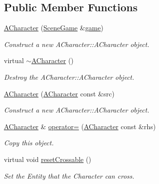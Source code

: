 \subsection*{Public Member Functions}
\begin{DoxyCompactItemize}
\item 
\hyperlink{class_a_character_a110d0c6cd4cb1803d749e8638218790a}{A\+Character} (\hyperlink{class_scene_game}{Scene\+Game} \&\hyperlink{class_a_entity_aa2c05db944a8b7487eb8470dd20211ab}{game})
\begin{DoxyCompactList}\small\item\em Construct a new A\+Character\+::\+A\+Character object. \end{DoxyCompactList}\item 
\mbox{\label{class_a_character_a244d7f65a86dea894a603c72453cbcf5}} 
virtual \hyperlink{class_a_character_a244d7f65a86dea894a603c72453cbcf5}{$\sim$\+A\+Character} ()
\begin{DoxyCompactList}\small\item\em Destroy the A\+Character\+::\+A\+Character object. \end{DoxyCompactList}\item 
\hyperlink{class_a_character_a157dffb2b05045b84dd3302267696bcd}{A\+Character} (\hyperlink{class_a_character}{A\+Character} const \&src)
\begin{DoxyCompactList}\small\item\em Construct a new A\+Character\+::\+A\+Character object. \end{DoxyCompactList}\item 
\hyperlink{class_a_character}{A\+Character} \& \hyperlink{class_a_character_ad38be256f14ea4844adbcf4643837994}{operator=} (\hyperlink{class_a_character}{A\+Character} const \&rhs)
\begin{DoxyCompactList}\small\item\em Copy this object. \end{DoxyCompactList}\item 
\mbox{\label{class_a_character_a8c942af7e72f1f0ac5e990e88da3ed4b}} 
virtual void \hyperlink{class_a_character_a8c942af7e72f1f0ac5e990e88da3ed4b}{reset\+Crossable} ()
\begin{DoxyCompactList}\small\item\em Set the Entity that the Character can cross. \end{DoxyCompactList}\item 

\end{DoxyCompactItemize}
